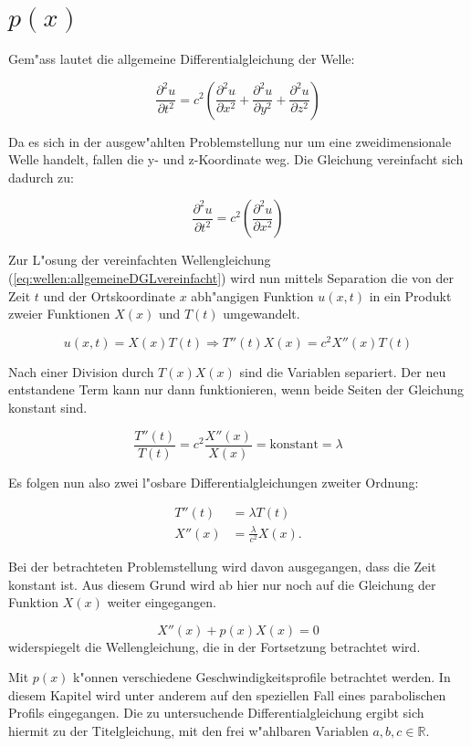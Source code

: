 \section{\texorpdfstring{$p(x)$}{p(x)}}
Gem"ass \cite{wellen:smirnow2} lautet die allgemeine Differentialgleichung der 
Welle:

\begin{equation*}
	\frac{\partial^2 u}{\partial t^2}
	=
	c^2
	\left(
		\frac{\partial^2 u}{\partial x^2} 
		+ \frac{\partial^2 u}{\partial y^2} 
		+ \frac{\partial^2 u}{\partial z^2}
	\right)
	\label{eq:wellen:allgemeineDGL}
\end{equation*}

Da es sich in der ausgew"ahlten Problemstellung nur um eine zweidimensionale 
Welle handelt, fallen die y- und z-Koordinate weg. Die Gleichung vereinfacht 
sich dadurch zu:

\begin{equation}
	\frac{\partial^2 u}{\partial t^2}
	=
	c^2
	\left(
		\frac{\partial^2 u}{\partial x^2} 
	\right)
	\label{eq:wellen:allgemeineDGLvereinfacht}
\end{equation}

Zur L"osung der vereinfachten Wellengleichung 
(\ref{eq:wellen:allgemeineDGLvereinfacht}) wird nun mittels Separation die von 
der Zeit $t$ und der Ortskoordinate $x$ abh"angigen Funktion $u(x,t)$ in ein 
Produkt zweier Funktionen $X(x)$ und $T(t)$ umgewandelt.

\begin{equation*}
	u (x,t) = X(x) T(t)
	\Rightarrow T''(t) X(x) = c^2 X''(x)T(t)
\end{equation*}

Nach einer Division durch $T(x)X(x)$ sind die Variablen separiert. Der neu 
entstandene Term kann nur dann funktionieren, wenn beide Seiten der Gleichung 
konstant sind.

\begin{equation*}
	\frac{T''(t)}{T(t)}
	=
	c^2 \frac{X''(x)}{X(x)} = \text{konstant} = \lambda
\end{equation*}

Es folgen nun also zwei l"osbare Differentialgleichungen zweiter Ordnung:

\begin{align*}
	T''(t) &= \lambda T(t) \\
	X''(x) &= \frac{\lambda}{c^2}X(x).
\end{align*}

Bei der betrachteten Problemstellung wird davon ausgegangen, dass die 
Zeit konstant ist. Aus diesem Grund wird ab hier nur noch auf die Gleichung 
der Funktion $X(x)$ weiter eingegangen.

\begin{equation*}
	X''(x) + p(x) X(x) = 0
\end{equation*}
widerspiegelt die Wellengleichung, die in der Fortsetzung betrachtet wird.

Mit $p(x)$ k"onnen verschiedene Geschwindigkeitsprofile betrachtet werden. In 
diesem Kapitel wird unter anderem auf den speziellen Fall eines parabolischen 
Profils eingegangen. Die zu untersuchende Differentialgleichung ergibt sich 
hiermit zu der Titelgleichung, mit den frei w"ahlbaren Variablen ${a,b,c} \in 
\mathbb{R}$.